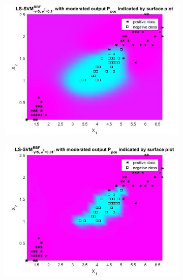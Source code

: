\documentclass[11pt,oneside,a4paper]{article}
\begin{document}
\begin{figure}[H]
	\begin{subfigure}[b]{0.4\textwidth}
		\includegraphics[width=\textwidth]{../Figures/sig_1_bayes}
	\end{subfigure}
	\begin{subfigure}[b]{0.4\textwidth}
		\includegraphics[width=\textwidth]{../Figures/sig_01_bayes}
	\end{subfigure}
	\begin{subfigure}[b]{0.4\textwidth}

\end{subfigure}
\end{figure}
\end{document}
